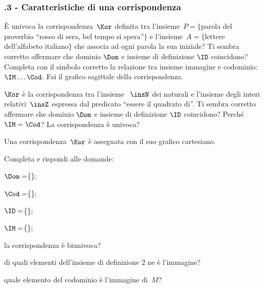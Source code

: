 \subsubsection*{\thechapter.3 - Caratteristiche di una corrispondenza}
\begin{esercizio}
\label{ese:C.4}
\`E univoca la corrispondenza~$\Kor$ definita tra l'insieme~$P= \{$parola del proverbio ``rosso di sera, bel tempo si spera''$\}$ e l'insieme~$A=\{$lettere dell'alfabeto italiano$\}$
che associa ad ogni parola la sua iniziale? Ti sembra corretto affermare che dominio $\Dom$ e insieme di definizione $\ID$ coincidono? Completa con il simbolo corretto
la relazione tra insieme immagine e codominio:~$\IM\ldots\Cod$. Fai il grafico sagittale della corrispondenza.
\end{esercizio}

\begin{esercizio}
\label{ese:C.5}
$\Kor$ è la corrispondenza tra l'insieme ~$\insN$ dei naturali e l'insieme degli interi relativi~$\insZ$ espressa dal predicato ``essere il quadrato di''. Ti sembra corretto affermare che
dominio $\Dom$ e insieme di definizione $\ID$ coincidono? Perché~$\IM=\Cod$? La corrispondenza è univoca?
\end{esercizio}

\pagebreak

\begin{esercizio}
\label{ese:C.6}
Una corrispondenza~$\Kor$ è assegnata con il suo grafico cartesiano.
\begin{center}
 
\end{center}
Completa e rispondi alle domande:

\begin{enumeratea}
\item $\Dom=$\{\dotfill\};
\item $\Cod=$\{\dotfill\};
\item $\ID=$\{\dotfill\};
\item $\IM=$\{\dotfill\};
\item la corrispondenza è biunivoca?
\item di quali elementi dell'insieme di definizione 2 ne è l'immagine?
\item quale elemento del codominio è l'immagine di~$M$?
\end{enumeratea}
\end{esercizio}

